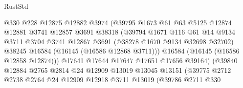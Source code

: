 \begin{lexlean}{RustStd}
\begin{coremodule}
                                  @330
                                  @228
                                  @12875
                                  @12882
                                  @3974
                                  (@39795
                                    @1673
                                    @61
                                    @63
                                    @5125
                                    @12874
                                    @12881
                                    @3741
                                    @12857
                                    @3691
                                    @38318
                                    (@39794
                                      @1671
                                      @116
                                      @61
                                      @14
                                      @9134
                                      @3711
                                      @3704
                                      @3741
                                      @12867
                                      @3691
                                      (@38278 @1670 @9134 @32698 @32702)
                                      @38245
                                      @16584
                                      (@16145 (@16586 @12868 @3711)))
                                    @16584
                                    (@16145 (@16586 @12858 @12874)))
                                  @17641
                                  @17644
                                  @17647
                                  @17651
                                  @17656
                                  @39164)
                                (@39840
                                  @12884
                                  @2765
                                  @2814
                                  @24
                                  @12909
                                  @13019
                                  @13045
                                  @13151
                                  (@39775
                                    @2712
                                    @2738
                                    @2764
                                    @24
                                    @12909
                                    @12918
                                    @3711
                                    @13019
                                    (@39786
                                      @2711
                                      @330

\end{coremodule}
\end{lexlean}
